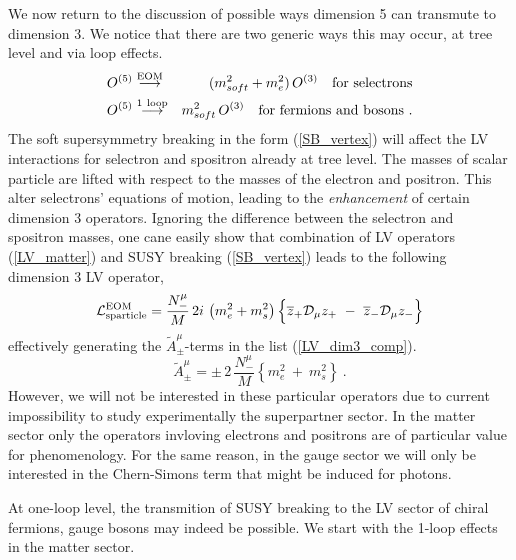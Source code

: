 \documentclass[paper,12pt]{revtex4}
\begin{document}
	We now return to the discussion of possible ways dimension 5 
can transmute to dimension 3. We notice that there are two generic ways this 
may occur, at tree level and via loop effects.
\begin{eqnarray*}
\nonumber
	O^{(5)} & \stackrel{\mathrm {EOM}}{\longrightarrow} &
			  (m_{soft}^2 + m_e^2)\, O^{(3)}~~~{\rm for~selectrons}\\
\nonumber
	O^{(5)} & \stackrel{\mathrm {1\ loop}}{\longrightarrow} &
			  m_{soft}^2\, O^{(3)} ~~~{\rm for~fermions ~and ~bosons}
~.
\end{eqnarray*}
The soft supersymmetry
	breaking in the form (\ref{SB_vertex}) will affect the
	LV interactions for selectron and spositron already at tree level.
The  masses of scalar particle are lifted with
	respect to the masses of the electron and positron. 
	This alter selectrons' equations of motion, leading to the 
	{\em enhancement} of certain dimension 3 operators.	Ignoring 
the difference between the selectron and spositron
	masses, one cane easily show that combination of LV operators (\ref{LV_matter}) and 
	SUSY breaking (\ref{SB_vertex}) leads to the following dimension 3 LV operator,
\begin{equation}
	  \mathcal{L}_{\rm sparticle}^{\rm EOM} = 
	\frac{N_-^\mu}{M}\, 2 i\, 
	\left(
		m_e^2 + m_s^2
	\right)
	\Bigl\{ 
		\overline{z}_+ \mathcal{D}_\mu z_+ 
		~-~
		\overline{z}_- \mathcal{D}_\mu z_- 
	\Bigr\}
\end{equation}
effectively  generating the $ \widetilde{A}^\mu_\pm $-terms in 
	the list (\ref{LV_dim3_comp}). \begin{equation}
	\widetilde{A}_\pm^\mu = 
	\pm\, 2\, \frac{N_-^\mu}
                        { M }   
	\left\{
		m_e^2 ~+~ m_s^2
	\right\}~.
\end{equation}
However, we will not be interested in these particular operators 
	due to current impossibility to study experimentally  the superpartner sector. 
	In the matter sector only the operators invloving electrons and positrons are 
     of particular value for phenomenology.  
For the same reason, in the gauge sector we will only be interested
	in the Chern-Simons term that might be induced for photons.
	
At one-loop level, the transmition 
	of SUSY breaking to the LV sector of chiral fermions, gauge bosons may indeed
	be possible. We start with the 1-loop effects in the matter sector.
\end{document}
